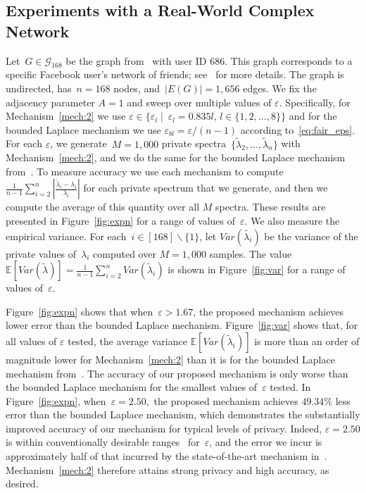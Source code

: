 \documentclass[conference]{ieeeconf}
\newcommand{\G}{\mathcal{G}}
\begin{document}
\subsection{Experiments with a Real-World Complex Network}
Let~$G\in \G_{168}$ be the graph from~\cite{snapnets} with user ID 686. This graph corresponds to a specific Facebook user's network
of friends; see~\cite{snapnets} for more details.
The graph is undirected, has~$n=168$ nodes, and~$|E(G)|=1,656$ edges. We fix the adjacency parameter $A=1$ and sweep over multiple values of $\varepsilon$.
Specifically, for Mechanism~\ref{mech:2} we use $\varepsilon \in \big\{ \varepsilon_l \mid \  \varepsilon_l = 0.835l, \, l \in \{1,2, \dots, 8\} \big\}$ and for the bounded Laplace mechanism we use $\varepsilon_{bl} = \varepsilon/(n-1)$ according to~\eqref{eq:fair_eps}.
For each $\varepsilon$, we generate~${M=1,000}$ private spectra~$\{\tilde\lambda_2,\dots,\tilde\lambda_n\}$
with Mechanism~\ref{mech:2}, and we do the same for the bounded Laplace mechanism from~\cite{hawkins2023node}. 
To measure accuracy we use each mechanism to compute $\frac{1}{n-1}\sum_{i=2}^n |\frac{\tilde{\lambda}_i-\lambda_i}{\lambda_i}|$ for each private spectrum
that we generate, and then we compute the average of this quantity over all $M$ spectra. These results are presented in Figure~\ref{fig:expn}
for a range of values of~$\varepsilon$. 
We also measure the empirical variance. 
For each~$i \in [168] \backslash \{1\}$, 
let $Var(\tilde{\lambda_i})$ be the variance 
of the private values of~$\lambda_i$ 
computed over $M=1,000$ samples. 
The value  $\mathbb{E}\left[Var(\tilde\lambda)\right]=\frac{1}{n-1}\sum_{i=2}^{n}Var(\tilde\lambda_i)$ is shown in Figure~\ref{fig:var}
for a range of values of~$\varepsilon$.

Figure~\ref{fig:expn} shows that when~$\varepsilon>1.67$, the proposed mechanism achieves lower error than the bounded Laplace mechanism. 
Figure~\ref{fig:var} shows that, for all 
values of $\varepsilon$ tested,
the average variance $\mathbb{E}[Var(\tilde{\lambda}_i)]$ is more than an order of magnitude lower
for Mechanism~\ref{mech:2} than it is for the bounded Laplace mechanism from~\cite{hawkins2023node}. 
The accuracy of our proposed mechanism is only worse than the bounded Laplace mechanism for the 
smallest values of~$\varepsilon$ tested.
In Figure~\ref{fig:expn}, when~$\varepsilon=2.50,$  the proposed mechanism achieves $49.34\%$ less error than the bounded Laplace mechanism, which
demonstrates the substantially improved accuracy of our mechanism for typical levels of privacy.
Indeed, $\varepsilon = 2.50$ is within conventionally desirable ranges~\cite{hsu2014differential} for~$\varepsilon$, and the error we incur
is approximately half of that incurred by the state-of-the-art mechanism in~\cite{hawkins2023node}.
Mechanism~\ref{mech:2} therefore attains strong privacy and high accuracy, as desired. 
\end{document}
